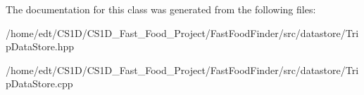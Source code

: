 The documentation for this class was generated from the following files\-:\begin{DoxyCompactItemize}
\item 
/home/edt/\-C\-S1\-D/\-C\-S1\-D\-\_\-\-Fast\-\_\-\-Food\-\_\-\-Project/\-Fast\-Food\-Finder/src/datastore/Trip\-Data\-Store.\-hpp\item 
/home/edt/\-C\-S1\-D/\-C\-S1\-D\-\_\-\-Fast\-\_\-\-Food\-\_\-\-Project/\-Fast\-Food\-Finder/src/datastore/Trip\-Data\-Store.\-cpp\end{DoxyCompactItemize}
